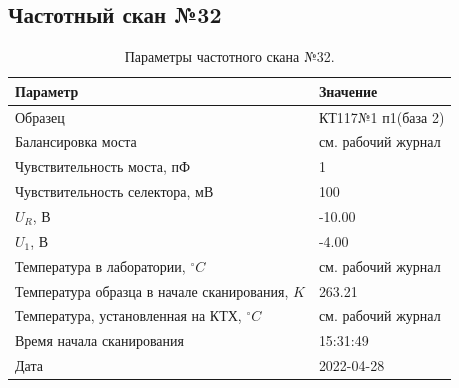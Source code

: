 \subsection{Частотный скан №32}
\begin{table}[!ht]
    \centering
    \caption{Параметры частотного скана №32.}
    \begin{tabular}{|l|l|}
        \hline
        Параметр                                       & Значение                  \\ \hline
        Образец                                        & КТ117№1 п1(база 2)        \\ \hline
        Балансировка моста                             & см. рабочий журнал        \\ \hline
        Чувствительность моста, пФ                     & 1                         \\ \hline
        Чувствительность селектора, мВ                 & 100                       \\ \hline
        $U_R$, В                                       & -10.00                    \\ \hline
        $U_1$, В                                       & -4.00                     \\ \hline
        Температура в лаборатории, $^\circ C$          & см. рабочий журнал        \\ \hline
        Температура образца в начале сканирования, $K$ & 263.21                    \\ \hline
        Температура, установленная на КТХ, $^\circ C$  & см. рабочий журнал        \\ \hline
        Время начала сканирования                      & 15:31:49                  \\ \hline
        Дата                                           & 2022-04-28                \\ \hline
    \end{tabular}
    \label{table:frequency_scan_32}
\end{table}

